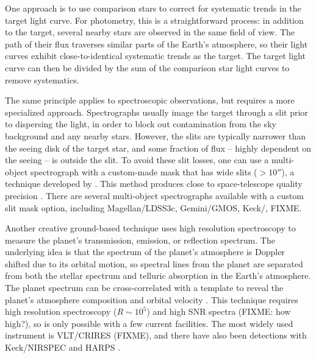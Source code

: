 \documentclass[graybox,natbib,nosecnum]{svmult}
\begin{document}
One approach is to use comparison stars to correct for systematic trends in the target light curve. For photometry, this is a straightforward process: in addition to the target, several nearby stars are observed in the same field of view. The path of their flux traverses similar parts of the Earth's atmosphere, so their light curves exhibit close-to-identical systematic trends as the target. The target light curve can then be divided by the sum of the comparison star light curves to remove systematics. 

The same principle applies to spectroscopic observations, but requires a more specialized approach.  Spectrographs usually image the target through a slit prior to dispersing the light, in order to block out contamination from the sky background and any nearby stars. However, the slits are typically narrower than the seeing disk of the target star, and some fraction of flux -- highly dependent on the seeing -- is outside the slit.  To avoid these slit losses, one can use a multi-object spectrograph with a custom-made mask that has wide slits ($>10''$), a technique developed by \cite{bean10}. This method produces close to space-telescope quality precision \citep[e.g.][]{}.  There are several multi-object spectrographs available with a custom slit mask option, including Magellan/LDSS3c, Gemini/GMOS, Keck/, FIXME.  

Another creative ground-based technique uses high resolution spectroscopy to measure the planet's transmission, emission, or reflection spectrum.  The underlying idea is that the spectrum of the planet's atmosphere is Doppler shifted due to its orbital motion, so spectral lines from the planet are separated from both the stellar spectrum and telluric absorption in the Earth's atmosphere. The planet spectrum can be cross-correlated with a template to reveal the planet's atmosphere composition and orbital velocity \citep[e.g.][]{snellen10}.  This technique requires high resolution spectroscopy ($R \sim 10^5$) and high SNR spectra (FIXME: how high?), so is only possible with a few current facilities. The most widely used instrument is VLT/CRIRES (FIXME), and there have also been detections with Keck/NIRSPEC and HARPS \citep{lockwood14, martins15}. 

\end{document}
